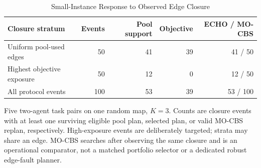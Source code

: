 \begin{table}[!t]
\caption{Small-Instance Response to Observed Edge Closure}\label{tab:operational}
\centering\scriptsize
\begin{tabularx}{\textwidth}{@{}Lrrrr@{}}
\toprule
\textbf{Closure stratum} & \textbf{Events} & \textbf{Pool support} & \textbf{Objective} & \textbf{ECHO / MO-CBS} \\
\midrule
Uniform pool-used edges & 50 & 41 & 39 & 41 / 50 \\
Highest objective exposure & 50 & 12 & 0 & 12 / 50 \\
All protocol events & 100 & 53 & 39 & 53 / 100 \\
\bottomrule
\end{tabularx}
\par\vspace{2pt}\raggedright\scriptsize Five two-agent task pairs on one random map, $K=3$. Counts are closure events with at least one surviving eligible pool plan, selected plan, or valid MO-CBS replan, respectively. High-exposure events are deliberately targeted; strata may share an edge. MO-CBS searches after observing the same closure and is an operational comparator, not a matched portfolio selector or a dedicated robust edge-fault planner.
\end{table}
